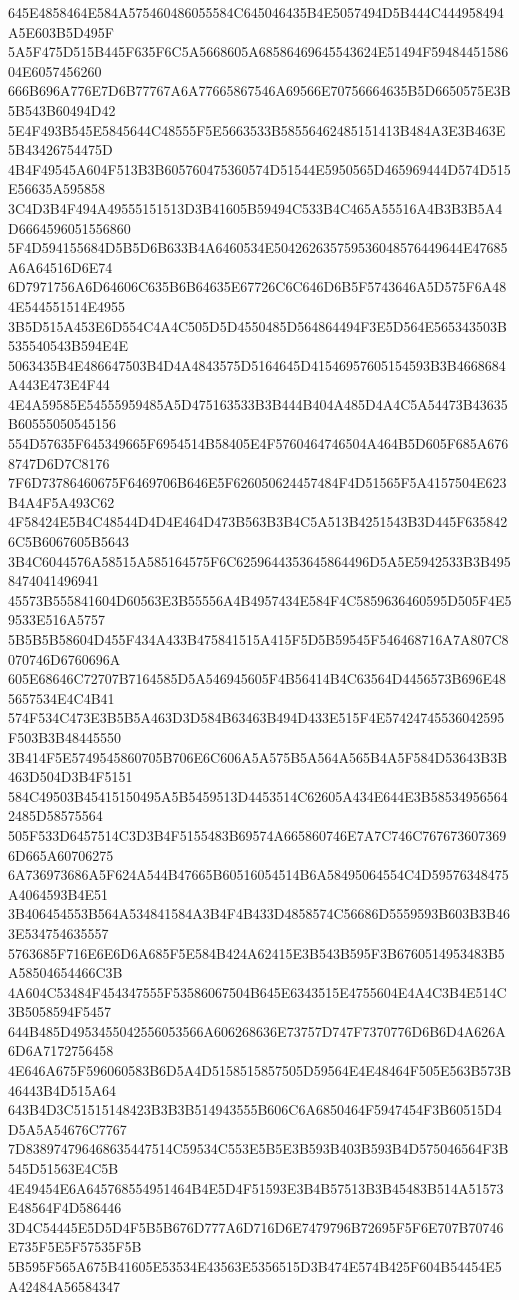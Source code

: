 {{{{{{{{{{{{{{{{{{{{{645E4858464E584A575460486055584C645046435B4E5057494D5B444C444958494A5E603B5D495F
5A5F475D515B445F635F6C5A5668605A68586469645543624E51494F5948445158604E6057456260
666B696A776E7D6B77767A6A77665867546A69566E70756664635B5D6650575E3B5B543B60494D42
5E4F493B545E5845644C48555F5E5663533B58556462485151413B484A3E3B463E5B43426754475D
4B4F49545A604F513B3B605760475360574D51544E5950565D465969444D574D515E56635A595858
3C4D3B4F494A49555151513D3B41605B59494C533B4C465A55516A4B3B3B5A4D6664596051556860
5F4D594155684D5B5D6B633B4A6460534E504262635759536048576449644E47685A6A64516D6E74
6D7971756A6D64606C635B6B64635E67726C6C646D6B5F5743646A5D575F6A484E544551514E4955
3B5D515A453E6D554C4A4C505D5D4550485D564864494F3E5D564E565343503B535540543B594E4E
5063435B4E486647503B4D4A4843575D5164645D41546957605154593B3B4668684A443E473E4F44
4E4A59585E54555959485A5D475163533B3B444B404A485D4A4C5A54473B43635B60555050545156
554D57635F645349665F6954514B58405E4F5760464746504A464B5D605F685A6768747D6D7C8176
7F6D73786460675F6469706B646E5F626050624457484F4D51565F5A4157504E623B4A4F5A493C62
4F58424E5B4C48544D4D4E464D473B563B3B4C5A513B4251543B3D445F6358426C5B6067605B5643
3B4C6044576A58515A585164575F6C6259644353645864496D5A5E5942533B3B4958474041496941
45573B555841604D60563E3B55556A4B4957434E584F4C5859636460595D505F4E59533E516A5757
5B5B5B58604D455F434A433B475841515A415F5D5B59545F546468716A7A807C8070746D6760696A
605E68646C72707B7164585D5A546945605F4B56414B4C63564D4456573B696E485657534E4C4B41
574F534C473E3B5B5A463D3D584B63463B494D433E515F4E57424745536042595F503B3B48445550
3B414F5E5749545860705B706E6C606A5A575B5A564A565B4A5F584D53643B3B463D504D3B4F5151
584C49503B45415150495A5B5459513D4453514C62605A434E644E3B585349565642485D58575564
505F533D6457514C3D3B4F5155483B69574A665860746E7A7C746C7676736073696D665A60706275
6A736973686A5F624A544B47665B60516054514B6A58495064554C4D59576348475A4064593B4E51
3B406454553B564A534841584A3B4F4B433D4858574C56686D5559593B603B3B463E534754635557
5763685F716E6E6D6A685F5E584B424A62415E3B543B595F3B6760514953483B5A58504654466C3B
4A604C53484F454347555F53586067504B645E6343515E4755604E4A4C3B4E514C3B5058594F5457
644B485D4953455042556053566A606268636E73757D747F7370776D6B6D4A626A6D6A7172756458
4E646A675F596060583B6D5A4D5158515857505D59564E4E48464F505E563B573B46443B4D515A64
643B4D3C51515148423B3B3B514943555B606C6A6850464F5947454F3B60515D4D5A5A54676C7767
7D838974796468635447514C59534C553E5B5E3B593B403B593B4D575046564F3B545D51563E4C5B
4E49454E6A645768554951464B4E5D4F51593E3B4B57513B3B45483B514A51573E48564F4D586446
3D4C54445E5D5D4F5B5B676D777A6D716D6E7479796B72695F5F6E707B70746E735F5E5F57535F5B
5B595F565A675B41605E53534E43563E5356515D3B474E574B425F604B54454E5A42484A56584347
}}}}}}}}}}}}}}}}}}}}}
